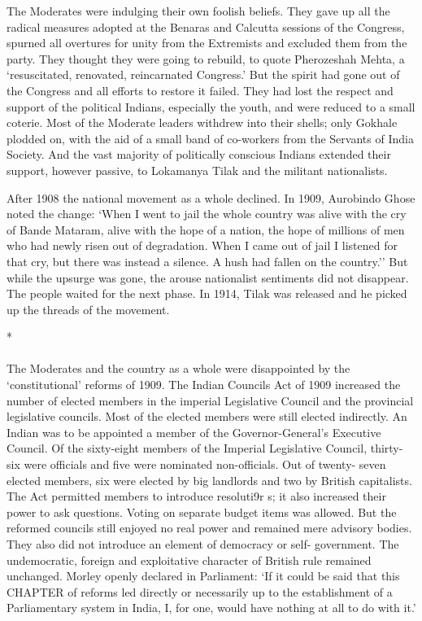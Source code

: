 The Moderates were indulging their own foolish beliefs. They gave up all the radical measures adopted at the Benaras and Calcutta sessions of the Congress, spurned all overtures for unity from the Extremists and excluded them from the party. They thought they were going to rebuild, to quote Pherozeshah Mehta, a `resuscitated, renovated, reincarnated Congress.' But the spirit had gone out of the Congress and all efforts to restore it failed. They had lost the respect and support of the political Indians, especially the youth, and were reduced to a small coterie. Most of the Moderate leaders withdrew into their shells; only Gokhale plodded on, with the aid of a small band of co-workers from the Servants of India Society. And the vast majority of politically conscious Indians extended their support, however passive, to Lokamanya Tilak and the militant nationalists.

After 1908 the national movement as a whole declined. In 1909, Aurobindo Ghose noted the change: `When I went to jail the whole country was alive with the cry of Bande Mataram, alive with the hope of a nation, the hope of millions of men who had newly risen out of degradation. When I came out of jail I listened for that cry, but there was instead a silence. A hush had fallen on the country.'' But while the upsurge was gone, the arouse nationalist sentiments did not disappear. The people waited for the next phase. In 1914, Tilak was released and he picked up the threads of the movement.

\begin{center}*\end{center}

\paragraph*{}


The Moderates and the country as a whole were disappointed by the `constitutional' reforms of 1909. The Indian Councils Act of 1909 increased the number of elected members in the imperial Legislative Council and the provincial legislative councils. Most of the elected members were still elected indirectly. An Indian was to be appointed a member of the Governor-General's Executive Council. Of the sixty-eight members of the Imperial Legislative Council, thirty-six were officials and five were nominated non-officials. Out of twenty- seven elected members, six were elected by big landlords and two by British capitalists. The Act permitted members to introduce resoluti9r s; it also increased their power to ask questions. Voting on separate budget items was allowed. But the reformed councils still enjoyed no real power and remained mere advisory bodies. They also did not introduce an element of democracy or self- government. The undemocratic, foreign and exploitative character of British rule remained unchanged. Morley openly declared in Parliament: `If it could be said that this CHAPTER of reforms led directly or necessarily up to the establishment of a Parliamentary system in India, I, for one, would have nothing at all to do with it.'

